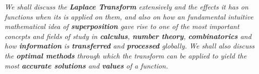 \textit{We shall discuss the \textbf{Laplace Transform} extensively and the effects it has on functions when its is applied on them, and also on how an fundamental intuitive mathematical idea of \textbf{superposition} gave rise to one of the most important concepts and fields of study in \textbf{calculus}, \textbf{number theory}, \textbf{combinatorics} and how \textbf{information} is \textbf{transferred} and \textbf{processed} globally. We shall also discuss the \textbf{optimal methods} through which the transform can be applied to yield the most \textbf{accurate solutions} and \textbf{values} of a function.}
